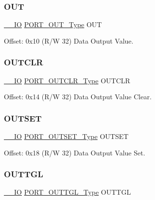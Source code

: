\subsubsection{\texorpdfstring{OUT}{OUT}}
{\footnotesize\ttfamily \mbox{\hyperlink{core__cm0plus_8h_aec43007d9998a0a0e01faede4133d6be}{\+\_\+\+\_\+\+IO}} \mbox{\hyperlink{union_p_o_r_t___o_u_t___type}{P\+O\+R\+T\+\_\+\+O\+U\+T\+\_\+\+Type}} O\+UT}



Offset\+: 0x10 (R/W 32) Data Output Value. 

\mbox{\label{struct_port_group_a0c8aa9e1ff193914f6ada585997da7c3}} 
\subsubsection{\texorpdfstring{OUTCLR}{OUTCLR}}
{\footnotesize\ttfamily \mbox{\hyperlink{core__cm0plus_8h_aec43007d9998a0a0e01faede4133d6be}{\+\_\+\+\_\+\+IO}} \mbox{\hyperlink{union_p_o_r_t___o_u_t_c_l_r___type}{P\+O\+R\+T\+\_\+\+O\+U\+T\+C\+L\+R\+\_\+\+Type}} O\+U\+T\+C\+LR}



Offset\+: 0x14 (R/W 32) Data Output Value Clear. 

\mbox{\label{struct_port_group_a943dbc3729651ff07a14e77161f99d14}} 
\subsubsection{\texorpdfstring{OUTSET}{OUTSET}}
{\footnotesize\ttfamily \mbox{\hyperlink{core__cm0plus_8h_aec43007d9998a0a0e01faede4133d6be}{\+\_\+\+\_\+\+IO}} \mbox{\hyperlink{union_p_o_r_t___o_u_t_s_e_t___type}{P\+O\+R\+T\+\_\+\+O\+U\+T\+S\+E\+T\+\_\+\+Type}} O\+U\+T\+S\+ET}



Offset\+: 0x18 (R/W 32) Data Output Value Set. 

\mbox{\label{struct_port_group_aec604143a1d0cc5cb0508fcbaac3b0c8}} 
\subsubsection{\texorpdfstring{OUTTGL}{OUTTGL}}
{\footnotesize\ttfamily \mbox{\hyperlink{core__cm0plus_8h_aec43007d9998a0a0e01faede4133d6be}{\+\_\+\+\_\+\+IO}} \mbox{\hyperlink{union_p_o_r_t___o_u_t_t_g_l___type}{P\+O\+R\+T\+\_\+\+O\+U\+T\+T\+G\+L\+\_\+\+Type}} O\+U\+T\+T\+GL}



